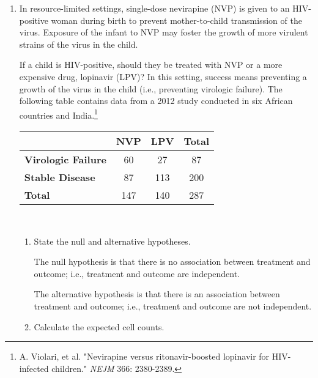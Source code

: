 \documentclass[letterpaper,12pt,twoside,]{pinp}
\begin{document}
\begin{enumerate}
\def\labelenumi{\arabic{enumi}.}
\setcounter{enumi}{2}
\item
  In resource-limited settings, single-dose nevirapine (NVP) is given to
  an HIV-positive woman during birth to prevent mother-to-child
  transmission of the virus. Exposure of the infant to NVP may foster
  the growth of more virulent strains of the virus in the child.

  If a child is HIV-positive, should they be treated with NVP or a more
  expensive drug, lopinavir (LPV)? In this setting, success means
  preventing a growth of the virus in the child (i.e., preventing
  virologic failure). The following table contains data from a 2012
  study conducted in six African countries and
  India.\footnote{A. Violari, et al. "Nevirapine versus ritonavir-boosted lopinavir for HIV-infected children." \textit{NEJM} 366: 2380-2389.}

  \begin{center}
  \begin{tabular}{l|cc|c} 
  & \textbf{NVP} & \textbf{LPV} & \textbf{Total}\\ \hline
    \textbf{Virologic Failure} & 60 & 27 & 87  \\
    \textbf{Stable Disease} & 87 & 113 & 200 \\ \hline
    \textbf{Total} & 147 & 140 & 287  \\ 
  \end{tabular}\\
  \end{center}

  \vspace{0.5cm}

  \begin{enumerate}
  \def\labelenumii{\alph{enumii})}
  \item
    State the null and alternative hypotheses.

    \color{blue}

    The null hypothesis is that there is no association between
    treatment and outcome; i.e., treatment and outcome are independent.

    The alternative hypothesis is that there is an association between
    treatment and outcome; i.e., treatment and outcome are not
    independent.

    \color{black}
  \item
    Calculate the expected cell counts.

    \color{blue}


\end{enumerate}
\end{enumerate}
\end{document}
